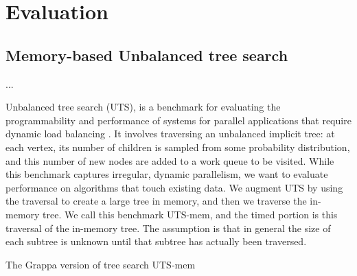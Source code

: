 \section{Evaluation} \label{sec:evaluation}

\subsection{Memory-based Unbalanced tree search}
...

Unbalanced tree search (UTS), is a benchmark for evaluating the programmability and performance of systems for parallel applications that require dynamic load balancing \cite{Olivier:uts2006}. It involves traversing an unbalanced implicit tree: at each vertex, its number of children is sampled from some probability distribution, and this number of new nodes are added to a work queue to be visited. While this benchmark captures irregular, dynamic parallelism, we want to evaluate performance on algorithms that touch existing data. We augment UTS by using the traversal to create a large tree in memory, and then we traverse the in-memory tree. We call this benchmark UTS-mem, and the timed portion is this traversal of the in-memory tree. The assumption is that in general the size of each subtree is unknown until that subtree has actually been traversed.


The Grappa version of tree search UTS-mem

